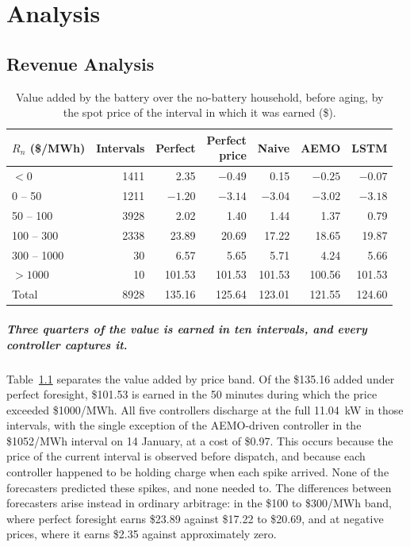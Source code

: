 \chapter{Analysis}

\section{Revenue Analysis}
\begin{table}[htbp]
    \centering
    \small
    \caption{Value added by the battery over the no-battery household, before aging,
    by the spot price of the interval in which it was earned (\$).}
    \label{tab:mpc:bands}
    \begin{tabular}{@{}lrrrrrr@{}}
        \toprule
        $R_n$ (\$/MWh) & Intervals & Perfect & \shortstack{Perfect\\price} & Naive & AEMO & LSTM \\
        \midrule
        $< 0$       & 1411 & 2.35   & $-0.49$ & 0.15   & $-0.25$ & $-0.07$ \\
        0 -- 50     & 1211 & $-1.20$ & $-3.14$ & $-3.04$ & $-3.02$ & $-3.18$ \\
        50 -- 100   & 3928 & 2.02   & 1.40   & 1.44   & 1.37   & 0.79 \\
        100 -- 300  & 2338 & 23.89  & 20.69  & 17.22  & 18.65  & 19.87 \\
        300 -- 1000 & 30   & 6.57   & 5.65   & 5.71   & 4.24   & 5.66 \\
        $> 1000$    & 10   & 101.53 & 101.53 & 101.53 & 100.56 & 101.53 \\
        \midrule
        Total       & 8928 & 135.16 & 125.64 & 123.01 & 121.55 & 124.60 \\
        \bottomrule
    \end{tabular}
\end{table}

\paragraph{Three quarters of the value is earned in ten intervals, and every controller captures it.}
Table~\ref{tab:mpc:bands} separates the value added by price band. Of the \$135.16 added
under perfect foresight, \$101.53 is earned in the 50 minutes during which the price
exceeded \$1000/MWh. All five controllers discharge at the full 11.04~kW in those
intervals, with the single exception of the AEMO-driven controller in the
\$1052/MWh interval on 14 January, at a cost of \$0.97. This occurs because the price of
the current interval is observed before dispatch, and because each controller happened
to be holding charge when each spike arrived. None of the forecasters predicted these
spikes, and none needed to. The differences between forecasters arise instead in
ordinary arbitrage: in the \$100 to \$300/MWh band, where perfect foresight earns
\$23.89 against \$17.22 to \$20.69, and at negative prices, where it earns \$2.35
against approximately zero.

